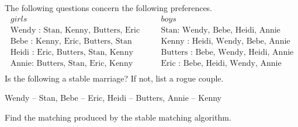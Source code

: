 \documentclass[12pt,twoside]{article}
\begin{document}

\newpage


\begin{problem}{10}
The following questions concern the
following preferences.
\begin{eqnarray*}
girls & \quad & boys \\
\text{Wendy : Stan, Kenny, Butters, Eric} & \quad & \text{Stan: Wendy, Bebe, Heidi, Annie} \\
\text{Bebe : Kenny, Eric, Butters, Stan} & \quad & \text{Kenny : Heidi, Wendy, Bebe, Annie} \\
\text{Heidi : Eric, Butters, Stan, Kenny} & \quad & \text{Butters : Bebe, Wendy, Heidi, Annie} \\
\text{Annie: Butters, Stan, Eric, Kenny} & \quad & \text{Eric : Bebe, Heidi, Wendy, Annie} \\
\end{eqnarray*}
\bparts
{}
Is the following a stable marriage? If not, list a rogue couple.
\begin{center}
Wendy -- Stan, Bebe -- Eric, Heidi -- Butters, Annie -- Kenny \\
\end{center}

Find the matching produced by the stable matching algorithm.

\end{problem}
\end{document}

